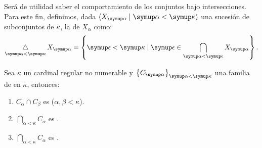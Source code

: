 Será de utilidad saber el comportamiento de los conjuntos \cna{} bajo intersecciones.
Para este fin, definimos, dada $\op{X_\alpha\mid \alpha<\kappa}$ una sucesión
de subconjuntos de $\kappa$, la  de
$X_\alpha$ como:
\[
    \dint_{\alpha<\kappa}X_\alpha
    =
    \set{\epsilon<\kappa\mid\epsilon\in \bigcap_{\alpha<\epsilon}X_\alpha} .
\]

\begin{teo}\label{teo:intersection-cna}
    Sea $\kappa$ un cardinal regular no numerable y $\set{C_\alpha}_{\alpha<\kappa}$ una familia
    de \cna{} en $\kappa$, entonces:
    \begin{enumerate}[label=(\roman*)]
        \item $C_\alpha\cap C_\beta$ es \cna{} ($\alpha,\beta < \kappa$).
        \item $\bigcap_{\alpha<\kappa}C_\alpha$ es \cna.
        \item $\dint_{\alpha<\kappa}C_\alpha$ es \cna.
    \end{enumerate}
\end{teo}

